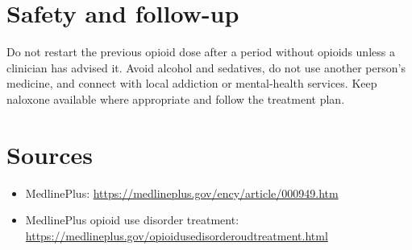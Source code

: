\section*{Safety and follow-up}
Do not restart the previous opioid dose after a period without opioids unless a clinician has advised it. Avoid alcohol and sedatives, do not use another person’s medicine, and connect with local addiction or mental-health services. Keep naloxone available where appropriate and follow the treatment plan.

\section*{Sources}
\begin{itemize}
\item MedlinePlus: \url{https://medlineplus.gov/ency/article/000949.htm}
\item MedlinePlus opioid use disorder treatment: \url{https://medlineplus.gov/opioidusedisorderoudtreatment.html}
\end{itemize}
